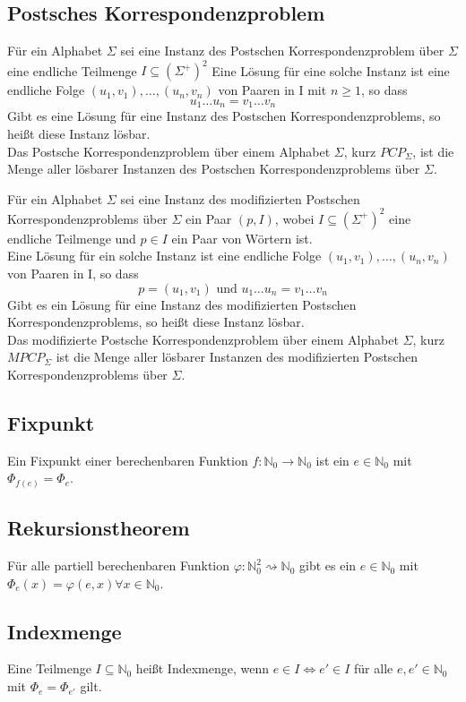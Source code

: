 \documentclass[DIV=15]{scrartcl}
\begin{document}
    \subsection{Postsches Korrespondenzproblem}
        Für ein Alphabet \(\Sigma\) sei eine Instanz des Postschen Korrespondenzproblem über \(\Sigma\)
        eine endliche Teilmenge \(I\subseteq(\Sigma^+)^2\) Eine Lösung für eine solche Instanz ist eine 
        endliche Folge \((u_1,v_1),\dots,(u_n,v_n)\) von Paaren in I mit \(n\geq1\), so dass 
        \[u_1\dots u_n=v_1\dots v_n\]
        Gibt es eine Lösung für eine Instanz des Postschen Korrespondenzproblems, so heißt diese Instanz lösbar.\\
        Das Postsche Korrespondenzproblem über einem Alphabet \(\Sigma\), kurz \(PCP_\Sigma\), ist die Menge 
        aller lösbarer Instanzen des Postschen Korrespondenzproblems über \(\Sigma\).\par\bigskip
        Für ein Alphabet \(\Sigma\) sei eine Instanz des modifizierten Postschen Korrespondenzproblems über \(\Sigma\)
        ein Paar \((p,I)\), wobei \(I\subseteq(\Sigma^+)^2\) eine endliche Teilmenge und \(p\in I\) ein Paar von Wörtern ist.\\
        Eine Lösung für ein solche Instanz ist eine endliche Folge \((u_1,v_1),\dots,(u_n,v_n)\) von Paaren in I, so dass 
        \[p=(u_1,v_1)\text{ und }u_1\dots u_n=v_1\dots v_n\]
        Gibt es ein Lösung für eine Instanz des modifizierten Postschen Korrespondenzproblems, so heißt diese Instanz lösbar.\\
        Das modifizierte Postsche Korrespondenzproblem über einem Alphabet \(\Sigma\), kurz \(MPCP_\Sigma\) ist die Menge aller 
        lösbarer Instanzen des modifizierten Postschen Korrespondenzproblems über \(\Sigma\).
    \subsection{Fixpunkt}
        Ein Fixpunkt einer berechenbaren Funktion \(f:\mathbb{N}_0\to \mathbb{N}_0\) ist ein \(e\in\mathbb{N}_0\) mit 
        \(\Phi_{f(e)}=\Phi_e\).
    \subsection{Rekursionstheorem}
        Für alle partiell berechenbaren Funktion \(\varphi:\mathbb{N}_0^2\rightsquigarrow\mathbb{N}_0\) gibt es ein 
        \(e\in\mathbb{N}_0\) mit \(\Phi_e(x)=\varphi(e,x)\forall x\in\mathbb{N}_0\).
    \subsection{Indexmenge}
        Eine Teilmenge \(I\subseteq\mathbb{N}_0\) heißt Indexmenge, wenn \(e\in I\Leftrightarrow e'\in I\)
        für alle \(e,e'\in\mathbb{N}_0\) mit \(\Phi_e=\Phi_{e'}\) gilt.
\newpage 
\end{document}

